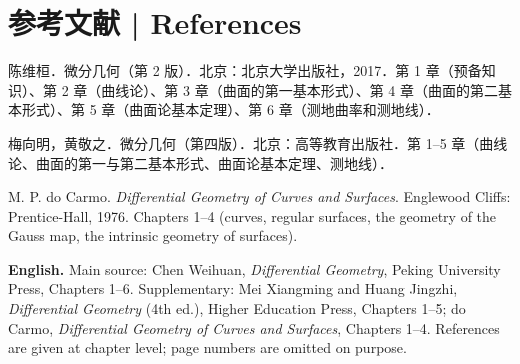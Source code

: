 \documentclass[UTF8,11pt,a4paper]{ctexart}
\newcommand{\EN}[1]{\par\noindent \textbf{English.} #1\par}
\begin{document}
\section*{参考文献 | References}
\noindent 陈维桓．微分几何（第 2 版）．北京：北京大学出版社，2017．第 1 章（预备知识）、第 2 章（曲线论）、第 3 章（曲面的第一基本形式）、第 4 章（曲面的第二基本形式）、第 5 章（曲面论基本定理）、第 6 章（测地曲率和测地线）．\par
\noindent 梅向明，黄敬之．微分几何（第四版）．北京：高等教育出版社．第 1--5 章（曲线论、曲面的第一与第二基本形式、曲面论基本定理、测地线）．\par
\noindent M. P. do Carmo. \emph{Differential Geometry of Curves and Surfaces}. Englewood Cliffs: Prentice-Hall, 1976. Chapters 1--4 (curves, regular surfaces, the geometry of the Gauss map, the intrinsic geometry of surfaces).\par
\EN{Main source: Chen Weihuan, \emph{Differential Geometry}, Peking University Press, Chapters 1--6. Supplementary: Mei Xiangming and Huang Jingzhi, \emph{Differential Geometry} (4th ed.), Higher Education Press, Chapters 1--5; do Carmo, \emph{Differential Geometry of Curves and Surfaces}, Chapters 1--4. References are given at chapter level; page numbers are omitted on purpose.}
\end{document}
